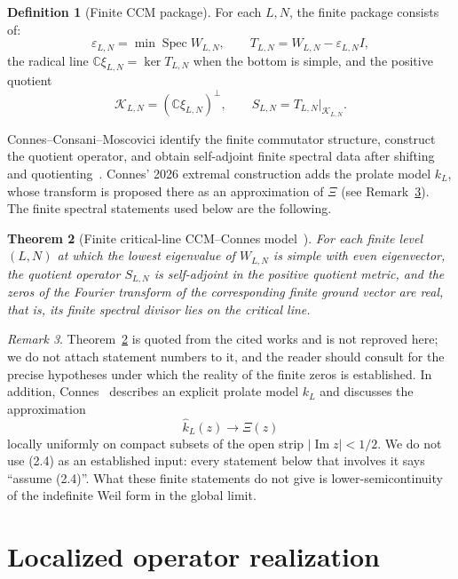 \documentclass[11pt]{amsart}
\newtheorem{theorem}{Theorem}[section]
\theoremstyle{definition}
\newtheorem{definition}[theorem]{Definition}
\theoremstyle{remark}
\newtheorem{remark}[theorem]{Remark}
\newcommand{\C}{\mathbb C}
\newcommand{\K}{\mathcal K}
\newcommand{\XiR}{\Xi}
\newcommand{\eps}{\varepsilon}
\DeclareMathOperator{\Spec}{Spec}
\begin{document}
\begin{definition}[Finite CCM package]
\label{def:ccm-package}
For each \(L,N\), the finite package consists of:
\[
 \eps_{L,N}=\min\Spec W_{L,N},
 \qquad
 T_{L,N}=W_{L,N}-\eps_{L,N}I,
\tag{2.2}
\]
the radical line \(\C\xi_{L,N}=\ker T_{L,N}\) when the bottom is simple,
and the positive quotient
\[
 \K_{L,N}=(\C\xi_{L,N})^\perp,
 \qquad
 S_{L,N}=T_{L,N}|_{\K_{L,N}}.
\tag{2.3}
\]
\end{definition}

Connes--Consani--Moscovici identify the finite commutator structure,
construct the quotient operator, and obtain self-adjoint finite spectral
data after shifting and quotienting~\cite{CCM2025}.  Connes' 2026
extremal construction
adds the prolate model \(k_L\), whose transform is proposed there as an approximation of \(\XiR\) (see Remark~\ref{rem:prolate-limit}).
The finite spectral statements used below are the following.

\begin{theorem}[Finite critical-line CCM--Connes model~\cite{CCM2025,Connes2026,CvS2025}]
\label{thm:ccm-input}
For each finite level \((L,N)\) at which the lowest eigenvalue of
\(W_{L,N}\) is simple with even eigenvector, the quotient operator
\(S_{L,N}\) is self-adjoint in the positive quotient metric, and the
zeros of the Fourier transform of the corresponding finite ground vector
are real, that is, its finite spectral divisor lies on the critical line.
\end{theorem}

\begin{remark}
\label{rem:prolate-limit}
Theorem~\ref{thm:ccm-input} is quoted from the cited works and is not
reproved here; we do not attach statement numbers to it, and the reader
should consult \cite{CCM2025,CvS2025} for the precise hypotheses under
which the reality of the finite zeros is established.  In addition,
Connes~\cite{Connes2026} describes an explicit prolate model \(k_L\)
and discusses the approximation
\[
 \widehat k_L(z)\longrightarrow \XiR(z)
\tag{2.4}
\]
locally uniformly on compact subsets of the open strip
\(|\operatorname{Im}z|<1/2\).  We do not use (2.4) as an established
input: every statement below that involves it says ``assume (2.4)''.
What these finite statements do not give is lower-semicontinuity of the
indefinite Weil form in the global limit.
\end{remark}

\section{Localized operator realization}
\end{document}
